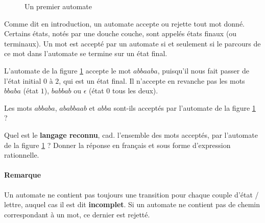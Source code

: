 \begin{figure}[!h]
\centering
{}
\caption{Un premier automate}
\label{aaauto}
\end{figure}

Comme dit en introduction, un automate accepte ou rejette tout mot donné. Certains états, notés par une douche couche, sont appelés états finaux (ou terminaux). Un mot est accepté par un automate si et seulement si le parcours de ce mot dans l'automate se termine sur un état final.

\begin{example}
L'automate de la figure \ref{aaauto} accepte le mot $abbaaba$, puisqu'il nous fait passer de l'état initial $0$ à $2$, qui est un état final. Il n'accepte en revanche pas les mots $bbaba$ (état $1$), $babbab$ ou $\epsilon$ (état $0$ tous les deux).
\end{example}

\begin{exercice}
Les mots $abbaba$, $ababbaab$ et $abba$ sont-ils acceptés par l'automate de la figure \ref{aaauto} ?
\end{exercice}

\begin{exercice}
Quel est le \textbf{langage reconnu}, cad. l'ensemble des mots acceptés, par l'automate de la figure \ref{aaauto} ? Donner la réponse en français et sous forme d'expression rationnelle.
\end{exercice}

\paragraph*{Remarque} Un automate ne contient pas toujours une transition pour chaque couple d'état / lettre, auquel cas il est dit \textbf{incomplet}. Si un automate ne contient pas de chemin correspondant à un mot, ce dernier est rejetté.

